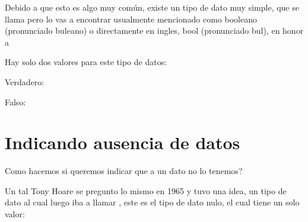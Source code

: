 \documentclass[letterpaper,10pt,spanish]{sphinxmanual}
\begin{document}
Debido a que esto es algo muy común, existe un tipo de dato muy simple, que
se llama  pero
lo vas a encontrar usualmente mencionado como booleano (pronunciado buleano) o directamente en ingles, bool (pronunciado bul),
en honor a 

Hay solo dos valores para este tipo de datos:

Verdadero:

%
\begin{sphinxVerbatim}[commandchars=\\\{\}]
\end{sphinxVerbatim}

%
\begin{sphinxVerbatim}[commandchars=\\\{\}]
 
\end{sphinxVerbatim}

Falso:

%
\begin{sphinxVerbatim}[commandchars=\\\{\}]
\end{sphinxVerbatim}

%
\begin{sphinxVerbatim}[commandchars=\\\{\}]
 
\end{sphinxVerbatim}


\section{Indicando ausencia de datos}
\label{\detokenize{datos-con-javascript:indicando-ausencia-de-datos}}
Como hacemos si queremos indicar que a un dato no lo tenemos?

Un tal Tony Hoare se pregunto lo mismo en 1965 y tuvo una idea, un tipo de dato
al cual luego iba a llamar  , este es el tipo
de dato nulo, el cual tiene un solo valor:

%
\begin{sphinxVerbatim}[commandchars=\\\{\}]
\end{sphinxVerbatim}
\end{document}
